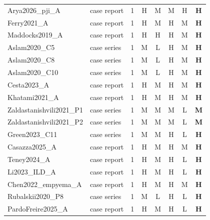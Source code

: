 \begin{tabular}{llcccccc}
Arya2026\_pji\_A & case report & 1 & H & M & M & H & \textbf{H} \\
Ferry2021\_A & case report & 1 & H & M & H & M & \textbf{H} \\
Maddocks2019\_A & case report & 1 & H & H & H & M & \textbf{H} \\
Aslam2020\_C5 & case series & 1 & M & L & H & M & \textbf{H} \\
Aslam2020\_C8 & case series & 1 & M & L & H & M & \textbf{H} \\
Aslam2020\_C10 & case series & 1 & M & L & H & M & \textbf{H} \\
Cesta2023\_A & case report & 1 & H & M & H & M & \textbf{H} \\
Khatami2021\_A & case report & 1 & H & M & H & M & \textbf{H} \\
Zaldastanishvili2021\_P1 & case series & 1 & M & M & M & L & \textbf{M} \\
Zaldastanishvili2021\_P2 & case series & 1 & M & M & M & L & \textbf{M} \\
Green2023\_C11 & case series & 1 & M & M & H & L & \textbf{H} \\
Casazza2025\_A & case report & 1 & H & M & H & M & \textbf{H} \\
Teney2024\_A & case report & 1 & H & M & H & L & \textbf{H} \\
Li2023\_ILD\_A & case report & 1 & H & M & H & L & \textbf{H} \\
Chen2022\_empyema\_A & case report & 1 & H & M & H & M & \textbf{H} \\
Rubalskii2020\_P8 & case series & 1 & M & L & H & L & \textbf{H} \\
PardoFreire2025\_A & case report & 1 & H & M & H & L & \textbf{H} \\
\bottomrule
\end{tabular}
